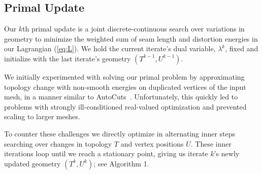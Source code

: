 \subsection{Primal Update}
\label{sec:primalUpdate}
Our $k$th primal update is a joint discrete-continuous search over variations in geometry to minimize the weighted sum of seam length and distortion energies in our Lagrangian (\ref{eq:L}). We hold the current iterate's dual variable, $\lambda^k$, fixed and initialize with the last iterate's geometry $(T^{k-1}, U^{k-1})$.


We initially experimented with solving our primal problem by approximating topology change with non-smooth energies on duplicated vertices of the input mesh, in a manner similar to AutoCuts\ \cite{Poranne2017Autocuts}. Unfortunately, this quickly led to problems with strongly ill-conditioned real-valued optimization and prevented scaling to larger meshes. 

To counter these challenges we directly optimize in alternating inner steps searching over changes in topology $T$ and vertex positions $U$. These inner iterations loop until we 
reach a stationary point, 
giving us iterate $k$'s newly updated geometry $(T^{k}, U^{k})$; see Algorithm 1.%


